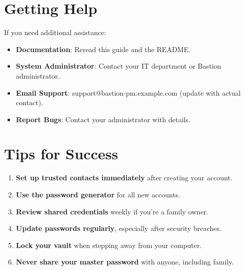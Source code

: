 \documentclass[11pt,a4paper]{article}
\begin{document}
\section{Getting Help}
If you need additional assistance:
\begin{itemize}
    \item \textbf{Documentation}: Reread this guide and the README.
    \item \textbf{System Administrator}: Contact your IT department or Bastion administrator.
    \item \textbf{Email Support}: support@bastion-pm.example.com (update with actual contact).
    \item \textbf{Report Bugs}: Contact your administrator with details.
\end{itemize}

\section{Tips for Success}
\begin{enumerate}
    \item \textbf{Set up trusted contacts immediately} after creating your account.
    \item \textbf{Use the password generator} for all new accounts.
    \item \textbf{Review shared credentials} weekly if you're a family owner.
    \item \textbf{Update passwords regularly}, especially after security breaches.
    \item \textbf{Lock your vault} when stepping away from your computer.
    \item \textbf{Never share your master password} with anyone, including family.
\end{enumerate}
\end{document}

